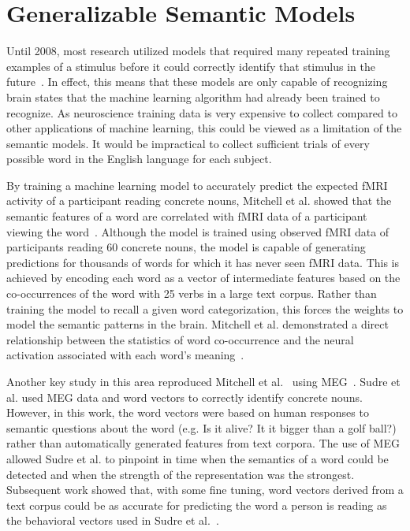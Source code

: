 \section{Generalizable Semantic Models}

Until 2008, most research utilized models that required many repeated training 
examples of a stimulus before it could correctly identify that stimulus in the 
future~\cite{kutas1980reading,kuperberg2007neural,Wang2002,Mitchell2002,Shinkareva2008,Gu2014}.
In effect, this means that these models are only capable of recognizing brain 
states that the machine learning algorithm had already been trained to 
recognize. As neuroscience training data is very expensive to collect compared 
to other applications of machine learning, this could be viewed as a limitation 
of the semantic models. It would be impractical to collect sufficient trials of 
every possible word in the English language for each subject.

By training a machine learning model to accurately predict the expected fMRI 
activity of a participant reading concrete nouns, Mitchell et al. showed that 
the semantic features of a word are correlated with fMRI data of a participant 
viewing the word~\cite{Mitchell2008}. Although the model is trained using 
observed fMRI data of participants reading 60 concrete nouns, the model is 
capable of generating predictions for thousands of words for which it has never 
seen fMRI data. This is achieved by encoding each word as a vector of 
intermediate features based on the co-occurrences of the word with 25 verbs in 
a large text corpus. Rather than training the model to recall a given word 
categorization, this forces the weights to model the semantic patterns in the 
brain. Mitchell et al. demonstrated a direct relationship between the 
statistics of word co-occurrence and the neural activation associated with each 
word's meaning~\cite{Mitchell2008}.

Another key study in this area reproduced Mitchell et al.~\cite{Mitchell2008} 
using MEG~\cite{Sudre2012}. Sudre et al. used MEG data and word vectors to 
correctly identify concrete nouns. However, in this work, the  word vectors 
were based on human responses to semantic questions about the word (e.g. Is it 
alive?  It it bigger than a golf ball?) rather than automatically generated 
features from text corpora. The use of MEG allowed Sudre et al. to pinpoint in 
time when the semantics of a word could be detected and when the strength of 
the representation was the strongest. Subsequent work showed that, with some 
fine tuning, word vectors derived from a text corpus could be as accurate for 
predicting the word a person is reading as the behavioral vectors used in Sudre 
et al.~\cite{Murphy2012}.
